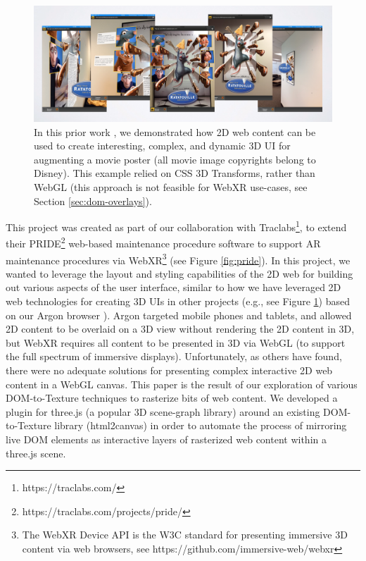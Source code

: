 \documentclass[sigconf]{acmart}
\begin{document}
\begin{figure}[h]
  \centering
  \includegraphics[width=\linewidth]{Ethereal-Demo.png}
  \caption{In this prior work \cite{Speiginer2014Ethereal:Content}, we demonstrated how 2D web content can be used to create interesting, complex, and dynamic 3D UI for augmenting a movie poster (all movie image copyrights belong to Disney). This example relied on CSS 3D Transforms, rather than WebGL (this approach is not feasible for WebXR use-cases, see Section \ref{sec:dom-overlays}).}
  \Description{}
  \label{fig:ethereal}
\end{figure}

This project was created as part of our collaboration with Traclabs\footnote{https://traclabs.com/}, to extend their PRIDE\footnote{https://traclabs.com/projects/pride/} web-based maintenance procedure software to support AR maintenance procedures via WebXR\footnote{The WebXR Device API is the W3C standard for presenting immersive 3D content via web browsers, see https://github.com/immersive-web/webxr} (see Figure \ref{fig:pride}). In this project, we wanted to leverage the layout and styling capabilities of the 2D web for building out various aspects of the user interface, similar to how we have leveraged 2D web technologies for creating 3D UIs in other projects (e.g., see Figure \ref{fig:ethereal}) based on our Argon browser \cite{MacIntyre2011TheEnvironment, Speiginer2015TheApplications}). Argon targeted mobile phones and tablets, and allowed 2D content to be overlaid on a 3D view without rendering the 2D content in 3D, but WebXR requires all content to be presented in 3D via WebGL (to support the full spectrum of immersive displays). Unfortunately, as others have found, there were no adequate solutions for presenting complex interactive 2D web content in a WebGL canvas. This paper is the result of our exploration of various DOM-to-Texture techniques to rasterize bits of web content. We developed  a plugin for three.js (a popular 3D scene-graph library) around an existing DOM-to-Texture library (html2canvas) in order to automate the process of mirroring live DOM elements as interactive layers of rasterized web content within a three.js scene. 
\end{document}
